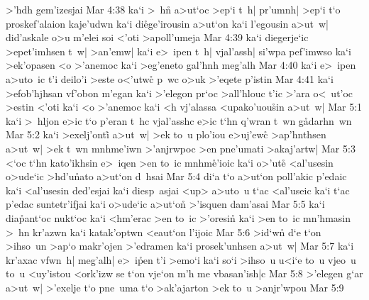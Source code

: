 >'hdh
gem'izesjai\bibvsend
\vs Mar 4:38
ka`i
>~hn\r{}
a>ut`oc
>ep`i
t~h|
pr'umnh|
>ep`i
t`o
proskef'alaion
kaje'udwn
ka`i
di\r{e}ge'irousin
a>ut`on
ka`i
l'egousin
a>ut~w|
did'askale
o>u
m'elei
soi
<'oti
>apoll'umeja\bibvsend
\vs Mar 4:39
ka`i
diegerje`ic
>epet'imhsen
t~w|
>an'emw|
ka`i
e>~ipen
t~h|
vjal'assh|
si'wpa
pef'imwso
ka`i
>ek'opasen
<o
>'anemoc
ka`i
>eg'eneto
gal'hnh
meg'alh\bibvsend
\vs Mar 4:40
ka`i
e>~ipen
a>uto~ic
t'i
deilo'i
>este
o<'utwc\r{}
p~wc
o>uk
>'eqete
p'istin\bibvsend
\vs Mar 4:41
ka`i
>efob'hjhsan
vf'obon
m'egan
ka`i
>'elegon
pr`oc
>all'hlouc
t'ic
>'ara
o<~ut'oc
>estin
<'oti
ka`i
<o
>'anemoc
ka`i
<h
vj'alassa
<upako'uou\r{s}in
a>ut~w|\bibvsend
\vs Mar 5:1
ka`i
>~hljon
e>ic
t`o
p'eran
t~hc
vjal'asshc
e>ic
t`hn
q'wran
t~wn
g\r{a}\-da\-rh\-n~wn\bibvsend
{}
\vs Mar 5:2
ka`i
>exelj'onti\r{}
a>ut~w|
>ek
to~u
plo'iou
e>uj'ewc\r{}
>ap'hnthsen
a>ut~w|
>ek
t~wn
mnhme'iwn
>'anjrwpoc
>en
pne'umati
>akaj'artw|\bibvsend
\vs Mar 5:3
<`oc
t`hn
kato'ikhsin
e>~iqen
>en
to~ic
mnhm\r{e}'ioic
ka`i
o>'ute\r{}
<al'usesin
o>ude`ic
>hd'u\r{n}ato
a>ut`on
d~hsai\bibvsend
\vs Mar 5:4
di`a
t`o
a>ut`on
poll'akic
p'edaic
ka`i
<al'usesin
ded'esjai
ka`i
diesp~asjai
<up>
a>uto~u
t`ac
<al'useic
ka`i
t`ac
p'edac
suntetr'ifjai
ka`i
o>ude`ic
a>ut`on\r{}
>'isquen
dam'asai\bibvsend
\vs Mar 5:5
ka`i
dia\r{p}ant`oc
nukt`oc
ka`i
<hm'erac
>en
to~ic
>'oresin\r{}
ka`i
>en
to~ic
mn'hmasin
>~hn
kr'azwn
ka`i
katak'optwn
<eaut`on
l'ijoic\bibvsend
\vs Mar 5:6
>id`wn\r{}
d`e
t`on
>ihso~un
>ap`o
makr'ojen
>'edramen
ka`i
prosek'unhsen
a>ut~w|\bibvsend
\vs Mar 5:7
ka`i
kr'axac
vfwn~h|
meg'alh|
e>~i\r{p}en
t'i
>emo`i
ka`i
so`i
>ihso~u
u<i`e
to~u
vjeo~u
to~u
<uy'istou
<ork'izw
se
t`on
vje`on
m'h
me
vbasan'ish|c\bibvsend
\vs Mar 5:8
>'elegen
g`ar
a>ut~w|
>'exelje
t`o
pne~uma
t`o
>ak'ajarton
>ek
to~u
>anjr'wpou\bibvsend
\vs Mar 5:9

